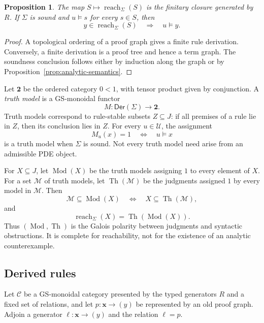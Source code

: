 \documentclass[10pt,journal,a4paper]{IEEEtran}
\newtheorem{proposition}[theorem]{Proposition}
\theoremstyle{definition}
\begin{document}
\begin{proposition}
The map $S\mapsto\operatorname{reach}_\Sigma(S)$ is the finitary closure generated by $R$. If $\Sigma$ is sound and $u\models s$ for every $s\in S$, then
\[
  y\in\operatorname{reach}_\Sigma(S)
  \quad\Longrightarrow\quad
  u\models y.
\]
\end{proposition}

\begin{proof}
A topological ordering of a proof graph gives a finite rule derivation. Conversely, a finite derivation is a proof tree and hence a term graph. The soundness conclusion follows either by induction along the graph or by Proposition~\ref{prop:analytic-semantics}.
\end{proof}

Let $\mathbf2$ be the ordered category $0<1$, with tensor product given by conjunction. A \emph{truth model} is a GS-monoidal functor
\[
  M:\mathsf{Der}(\Sigma)\longrightarrow\mathbf2.
\]
Truth models correspond to rule-stable subsets $Z\subseteq J$: if all premises of a rule lie in $Z$, then its conclusion lies in $Z$. For every $u\in\mathcal U$, the assignment
\[
  M_u(x)=1
  \quad\Longleftrightarrow\quad
  u\models x
\]
is a truth model when $\Sigma$ is sound. Not every truth model need arise from an admissible PDE object.

For $X\subseteq J$, let $\operatorname{Mod}(X)$ be the truth models assigning $1$ to every element of $X$. For a set $\mathcal M$ of truth models, let $\operatorname{Th}(\mathcal M)$ be the judgments assigned $1$ by every model in $\mathcal M$. Then
\[
  \mathcal M\subseteq\operatorname{Mod}(X)
  \quad\Longleftrightarrow\quad
  X\subseteq\operatorname{Th}(\mathcal M),
\]
and
\[
  \operatorname{reach}_\Sigma(X)
  =
  \operatorname{Th}(\operatorname{Mod}(X)).
\]
Thus $(\operatorname{Mod},\operatorname{Th})$ is the Galois polarity between judgments and syntactic obstructions. It is complete for reachability, not for the existence of an analytic counterexample.

\subsection{Derived rules}

Let $\mathcal C$ be a GS-monoidal category presented by the typed generators $R$ and a fixed set of relations, and let $p:\mathbf x\to(y)$ be represented by an old proof graph. Adjoin a generator $\ell:\mathbf x\to(y)$ and the relation $\ell=p$.
\end{document}
